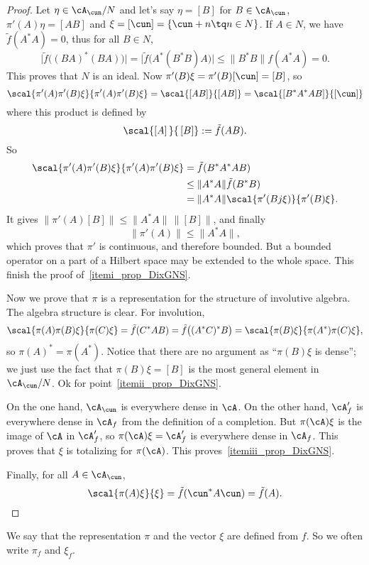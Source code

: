 \begin{proof}

	Let $\eta\in\cA_{\cun}/N$ and let's say $\eta=[B]$ for $B\in\cA_{\cun}$, $\pi'(A)\eta=[AB]$ and $\xi=[\cun]=\{ \cun+n\tq n\in N \}$. If $A\in N$, we have $\tilde f(A^*A)=0$, thus for all $B\in N$,
	\[
		\big|  \tilde f\big( (BA)^*(BA) \big)   \big|=\big| \tilde f\big( A^*(B^*B)A \big) \big| \leq \| B^*B \|f(A^*A)=0.
	\]
	This proves that $N$ is an ideal. Now $\pi'(B)\xi=\pi'(B)[\cun]=[B]$, so
	\[
		\scal{ \pi'(A)\pi'(B)\xi }{ \pi'(A)\pi'(B)\xi }=\scal{ [AB] }{ [AB] }
		=\scal{ [B^*A^*AB] }{ [\cun] }
	\]
	where this product is defined by
	\begin{equation}
		\scal{ [A]\, }{\, [B] }:=\tilde f(AB).
	\end{equation}
	So
	\[
		\begin{split}
			\scal{ \pi'(A)\pi'(B)\xi }{ \pi'(A)\pi'(B)\xi }&=\tilde f(B^*A^*AB)\\
			&\leq \| A^*A \|\tilde f(B^*B) \\
			&=\| A^*A \|\scal{ \pi'(Bj\xi) }{ \pi'(B)\xi }.
		\end{split}
	\]
	It gives $\| \pi'(A)[B] \|\leq\| A^*A \|\,\| [B] \|$, and finally
	\begin{equation}
		\| \pi'(A) \|\leq\| A^*A \|,
	\end{equation}
	which proves that $\pi'$ is continuous, and therefore bounded. But a bounded operator on a part of a Hilbert space may be extended to the whole space. This finish the proof of~\ref{itemi_prop_DixGNS}.

	Now we prove that $\pi$ is a representation for the structure of involutive algebra. The algebra structure is clear. For involution,
	\[
		\scal{ \pi(A)\pi(B)\xi }{ \pi(C)\xi }	=\tilde f(C^*AB)
		=\tilde f\big( (A^*C)^*B \big)
		=\scal{ \pi(B)\xi }{ \pi(A^*)\pi(C)\xi },
	\]
	so $\pi(A)^*=\pi(A^*)$. Notice that there are no argument as ``$\pi(B)\xi$ is dense''; we just use the fact that $\pi(B)\xi=[B]$ is the most general element in $\cA_{\cun}/N$. Ok for point~\ref{itemii_prop_DixGNS}.

	On the one hand, $\cA_{\cun}$ is everywhere dense in $\cA$. On the other hand, $\cA'_f$ is everywhere dense in $\cA_f$ from the definition of a completion. But $\pi(\cA)\xi$ is the image of $\cA$ in $\cA'_f$, so $\pi(\cA)\xi=\cA'_f$ is everywhere dense in $\cA_f$. This proves that $\xi$ is totalizing for $\pi(\cA)$.  This proves~\ref{itemiii_prop_DixGNS}.

	Finally, for all $A\in\cA_{\cun}$,
	\[
		\scal{ \pi(A)\xi }{ \xi }=\tilde f(\cun^*A\cun)=\tilde f(A).
	\]

\end{proof}
We say that the representation $\pi$ and the vector $\xi$ are defined from $f$. So we often write $\pi_f$ and $\xi_f$.

